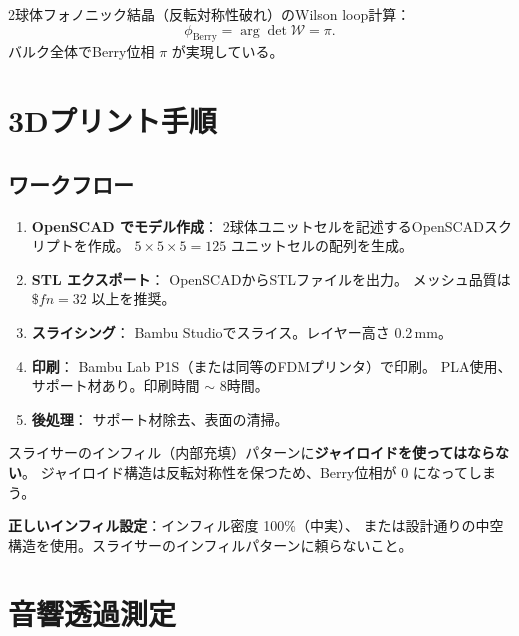 \begin{keyresult}
2球体フォノニック結晶（反転対称性破れ）のWilson loop計算：
\[
  \phi_{\text{Berry}} = \arg\det\mathcal{W} = \pi.
\]
バルク全体でBerry位相 $\pi$ が実現している。
\end{keyresult}

\section{3Dプリント手順}
\label{sec:14.3}

\subsection{ワークフロー}

\begin{enumerate}[label=\textbf{Step \arabic*:}]
  \item \textbf{OpenSCAD でモデル作成}：
        2球体ユニットセルを記述するOpenSCADスクリプトを作成。
        $5 \times 5 \times 5 = 125$ ユニットセルの配列を生成。
  \item \textbf{STL エクスポート}：
        OpenSCADからSTLファイルを出力。
        メッシュ品質は $\$fn = 32$ 以上を推奨。
  \item \textbf{スライシング}：
        Bambu Studioでスライス。レイヤー高さ 0.2\,mm。
  \item \textbf{印刷}：
        Bambu Lab P1S（または同等のFDMプリンタ）で印刷。
        PLA使用、サポート材あり。印刷時間 $\sim$ 8時間。
  \item \textbf{後処理}：
        サポート材除去、表面の清掃。
\end{enumerate}

\begin{warningbox}[ジャイロイドインフィルは使用禁止]
スライサーのインフィル（内部充填）パターンに\textbf{ジャイロイドを使ってはならない}。
ジャイロイド構造は反転対称性を保つため、Berry位相が $0$ になってしまう。

\medskip
\textbf{正しいインフィル設定}：インフィル密度 100\%（中実）、
または設計通りの中空構造を使用。スライサーのインフィルパターンに頼らないこと。
\end{warningbox}

\section{音響透過測定}
\label{sec:14.4}

